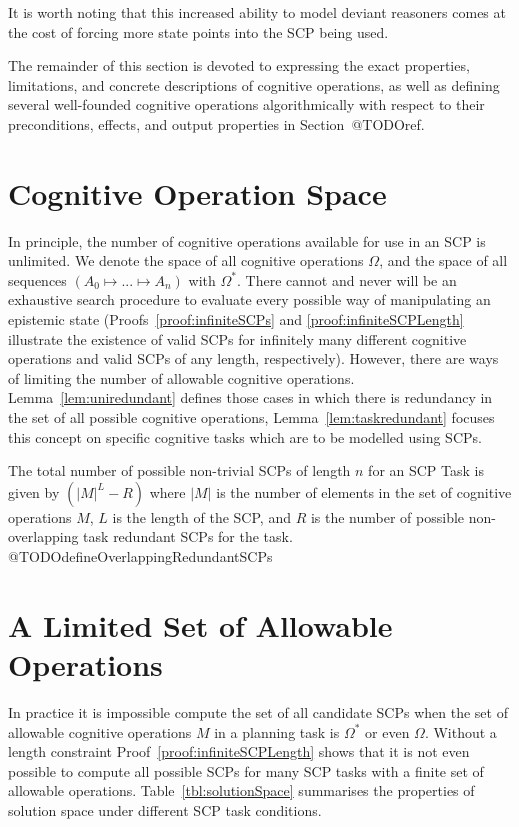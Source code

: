 It is worth noting that this increased ability to model deviant reasoners comes at the cost of forcing more state points into the SCP being used.

The remainder of this section is devoted to expressing the exact properties, limitations, and concrete descriptions of cognitive operations, as well as defining several well-founded cognitive operations algorithmically with respect to their preconditions, effects, and output properties in Section~@TODOref.

\section{Cognitive Operation Space}
In principle, the number of cognitive operations available for use in an SCP is unlimited. We denote the space of all cognitive operations $\Omega$, and the space of all sequences $(A_0 \longmapsto ... \longmapsto A_n)$ with $\Omega^*$. There cannot and never will be an exhaustive search procedure to evaluate every possible way of manipulating an epistemic state (Proofs~\ref{proof:infiniteSCPs} and \ref{proof:infiniteSCPLength} illustrate the existence of valid SCPs for infinitely many different cognitive operations and valid SCPs of any length, respectively). However, there are ways of limiting the number of allowable cognitive operations. Lemma~\ref{lem:uniredundant} defines those cases in which there is redundancy in the set of all possible cognitive operations, Lemma~\ref{lem:taskredundant} focuses this concept on specific cognitive tasks which are to be modelled using SCPs.

The total number of possible non-trivial SCPs of length $n$ for an SCP Task is given by $(|M|^L - R)$ where $|M|$ is the number of elements in the set of cognitive operations $M$, $L$ is the length of the SCP, and $R$ is the number of possible non-overlapping task redundant SCPs for the task. @TODOdefineOverlappingRedundantSCPs


\section{A Limited Set of Allowable Operations}
In practice it is impossible compute the set of all candidate SCPs when the set of allowable cognitive operations $M$ in a planning task is $\Omega^*$ or even $\Omega$. Without a length constraint Proof~\ref{proof:infiniteSCPLength} shows that it is not even possible to compute all possible SCPs for many SCP tasks with a finite set of allowable operations. Table~\ref{tbl:solutionSpace} summarises the properties of solution space under different SCP task conditions.

